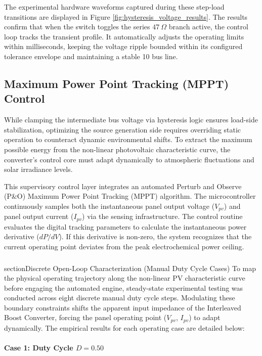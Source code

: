 The experimental hardware waveforms captured during these step-load transitions are displayed in Figure \ref{fig:hysteresis_voltage_results}. The results confirm that when the switch toggles the series $47\ \Omega$ branch active, the control loop tracks the transient profile. It automatically adjusts the operating limits within milliseconds, keeping the voltage ripple bounded within its configured tolerance envelope and maintaining a stable 10 bus line.

\subsection{Maximum Power Point Tracking (MPPT) Control}
While clamping the intermediate bus voltage via hysteresis logic ensures load-side stabilization, optimizing the source generation side requires overriding static operation to counteract dynamic environmental shifts. To extract the maximum possible energy from the non-linear photovoltaic characteristic curve, the converter's control core must adapt dynamically to atmospheric fluctuations and solar irradiance levels.

This supervisory control layer integrates an automated Perturb and Observe (P\&O) Maximum Power Point Tracking (MPPT) algorithm. The microcontroller continuously samples both the instantaneous panel output voltage ($V_{pv}$) and panel output current ($I_{pv}$) via the sensing infrastructure. The control routine evaluates the digital tracking parameters to calculate the instantaneous power derivative ($dP/dV$). If this derivative is non-zero, the system recognizes that the current operating point deviates from the peak electrochemical power ceiling.

\subsubsection{}section{Discrete Open-Loop Characterization (Manual Duty Cycle Cases)}
To map the physical operating trajectory along the non-linear PV characteristic curve before engaging the automated engine, steady-state experimental testing was conducted across eight discrete manual duty cycle steps. Modulating these boundary constraints shifts the apparent input impedance of the Interleaved Boost Converter, forcing the panel operating point ($V_{pv}$, $I_{pv}$) to adapt dynamically. The empirical results for each operating case are detailed below:

\paragraph{Case 1: Duty Cycle $D = 0.50$}

